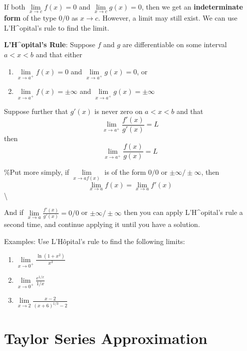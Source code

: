 \documentclass[]{book}
\theoremstyle{definition}
\theoremstyle{definition}
\theoremstyle{definition}
\theoremstyle{remark}
\begin{document}
If both \(\lim\limits_{x \to c} f(x)=0\) and
\(\lim\limits_{x \to c} g(x)=0\), then we get an \textbf{indeterminate
form} of the type \(0/0\) as \(x\to c\). However, a limit may still
exist. We can use L'H\^{}opital's rule to find the limit.

\textbf{L'H\^{}opital's Rule}: Suppose \(f\) and \(g\) are
differentiable on some interval \(a<x<b\) and that either

\begin{enumerate}
        \item $\lim\limits_{x\to a^+} f(x)=0$ and $\lim\limits_{x\to a^+} g(x)=0$, or
        \item $\lim\limits_{x\to a^+} f(x)=\pm\infty$ and $\lim\limits_{x\to a^+} g(x)=\pm\infty$\
\end{enumerate}

Suppose further that \(g'(x)\) is never zero on \(a<x<b\) and that
\[\lim\limits_{x\to a^+} \frac{f'(x)}{g'(x)}=L\] then
\[\lim\limits_{x\to a^+} \frac{f(x)}{g(x)}=L\]

\%Put more simply, if \(\lim\limits_{x\to a f(x)}\) is of the form
\(0/0\) or \(\pm \infty / \pm \infty\), then
\[\lim\limits_{x\to a} f(x) = \lim\limits_{x\to a} f'(x)\]\textbackslash{}

And if \(\lim\limits_{x\to a} \frac{f'(x)}{g'(x)} = 0/0\) or
\(\pm \infty / \pm \infty\) then you can apply L'H\^{}opital's rule a
second time, and continue applying it until you have a solution.

\begin{framed}
Examples:  Use L'H\^opital's rule to find the following limits:
    \begin{enumerate}
        \item \parbox[t]{1.5in}{$\lim\limits_{x\to 0^+}\frac{\ln(1+x^2)}{x^3}$ \\[15pt]}
            \parbox[t]{4in}{}

        \item \parbox[t]{1.5in}{$\lim\limits_{x\to  0^+} \frac{e^{1/x}}{1/x}$ \\[15pt]}
            \parbox[t]{4in}{}
        
        \item \parbox[t]{1.5in}{$\lim\limits_{x\to 2} \frac{x-2}{(x+6)^{1/3}-2}$ \\[15pt]}
            \parbox[t]{4in}{}
    \end{enumerate}
\end{framed}

\section{Taylor Series Approximation}\label{taylor-series-approximation}
\end{document}
